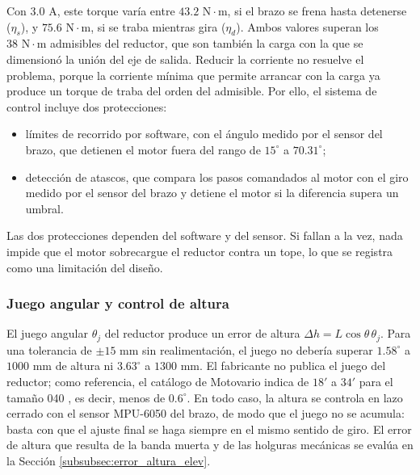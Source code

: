 \documentclass[../../General.tex]{subfiles}
\begin{document}
Con $3.0\text{ A}$, este torque varía entre $43.2\text{ N}\cdot\text{m}$, si el brazo se frena hasta detenerse ($\eta_s$), y $75.6\text{ N}\cdot\text{m}$, si se traba mientras gira ($\eta_d$). Ambos valores superan los $38\text{ N}\cdot\text{m}$ admisibles del reductor, que son también la carga con la que se dimensionó la unión del eje de salida. Reducir la corriente no resuelve el problema, porque la corriente mínima que permite arrancar con la carga ya produce un torque de traba del orden del admisible. Por ello, el sistema de control incluye dos protecciones:
\begin{itemize}
    \item límites de recorrido por software, con el ángulo medido por el sensor del brazo, que detienen el motor fuera del rango de $15^\circ$ a $70.31^\circ$;
    \item detección de atascos, que compara los pasos comandados al motor con el giro medido por el sensor del brazo y detiene el motor si la diferencia supera un umbral.
\end{itemize}
Las dos protecciones dependen del software y del sensor. Si fallan a la vez, nada impide que el motor sobrecargue el reductor contra un tope, lo que se registra como una limitación del diseño.

\subsubsection{Juego angular y control de altura}

El juego angular $\theta_j$ del reductor produce un error de altura $\Delta h = L\cos\theta\,\theta_j$. Para una tolerancia de $\pm 15\text{ mm}$ sin realimentación, el juego no debería superar $1.58^\circ$ a $1000\text{ mm}$ de altura ni $3.63^\circ$ a $1300\text{ mm}$. El fabricante no publica el juego del reductor; como referencia, el catálogo de Motovario indica de $18'$ a $34'$ para el tamaño 040 \citep{motovario_vsf}, es decir, menos de $0.6^\circ$. En todo caso, la altura se controla en lazo cerrado con el sensor MPU-6050 del brazo, de modo que el juego no se acumula: basta con que el ajuste final se haga siempre en el mismo sentido de giro. El error de altura que resulta de la banda muerta y de las holguras mecánicas se evalúa en la Sección \ref{subsubsec:error_altura_elev}.
\end{document}
